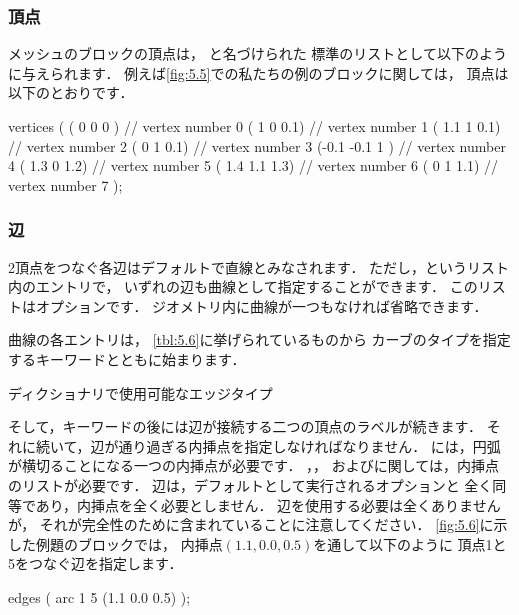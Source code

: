 \subsubsection{頂点}
\label{sssec:5.3.1.1}
メッシュのブロックの頂点は，
と名づけられた
標準のリストとして以下のように与えられます．
例えば\autoref{fig:5.5}での私たちの例のブロックに関しては，
頂点は以下のとおりです．
\begin{OFverbatim}[file]
vertices
(
    ( 0 0 0 ) // vertex number 0
    ( 1 0 0.1) // vertex number 1
    ( 1.1 1 0.1) // vertex number 2
    ( 0 1 0.1) // vertex number 3
    (-0.1 -0.1 1 ) // vertex number 4
    ( 1.3 0 1.2) // vertex number 5
    ( 1.4 1.1 1.3) // vertex number 6
    ( 0 1 1.1) // vertex number 7
);
\end{OFverbatim}

\subsubsection{辺}
\label{sssec:5.3.1.2}
2頂点をつなぐ各辺はデフォルトで直線とみなされます．
ただし，というリスト内のエントリで，
いずれの辺も曲線として指定することができます．
このリストはオプションです．
ジオメトリ内に曲線が一つもなければ省略できます．

曲線の各エントリは，
\autoref{tbl:5.6}に挙げられているものから
カーブのタイプを指定するキーワードとともに始まります．


\begin{table}[ht]
 
 \caption{ディクショナリで使用可能なエッジタイプ}
 \label{tbl:5.6}
\end{table}


そして，キーワードの後には辺が接続する二つの頂点のラベルが続きます．
それに続いて，辺が通り過ぎる内挿点を指定しなければなりません．
には，円弧が横切ることになる一つの内挿点が必要です．
，，
およびに関しては，内挿点のリストが必要です．
辺は，デフォルトとして実行されるオプションと
全く同等であり，内挿点を全く必要としません．
辺を使用する必要は全くありませんが，
それが完全性のために含まれていることに注意してください．
\autoref{fig:5.6}に示した例題のブロックでは，
内挿点$(1.1, 0.0, 0.5)$を通して以下のように
頂点1と5をつなぐ辺を指定します．
\begin{OFverbatim}[file]
edges
(
    arc 1 5 (1.1 0.0 0.5)
);
\end{OFverbatim}

